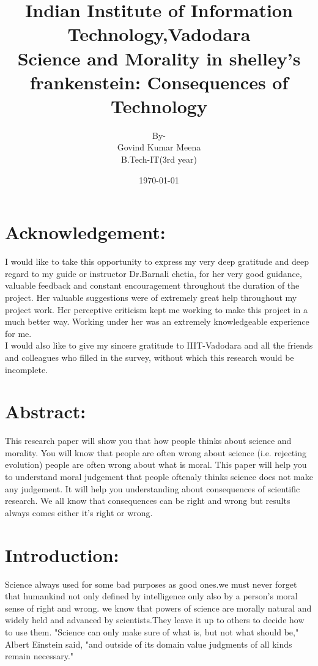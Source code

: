 \documentclass[12pt]{report}
\title{\textbf{Indian Institute of Information Technology,Vadodara\\} \color{blue}Science and Morality in shelley's frankenstein: Consequences of Technology}
\date{\today}
\author{By-\\ Govind Kumar Meena\\B.Tech-IT(3rd year)}
\begin{document}
\maketitle

\tableofcontents
\newpage
\section{Acknowledgement:}
\LARGE
I would like to take this opportunity to express my very deep gratitude and deep regard to my guide or instructor Dr.Barnali chetia, for her very good guidance, valuable feedback and constant encouragement throughout the duration of the project. Her valuable suggestions were of extremely great help throughout my project work. Her perceptive criticism kept me working to make this project in a much better way. Working under her was an extremely knowledgeable experience for me.\\
I would also like to give my sincere gratitude to IIIT-Vadodara and all the friends and colleagues who filled in the survey, without which this research would be incomplete.

\newpage
\section{Abstract:}
\LARGE
This research paper will show you that how people thinks about science and morality. You will know that  people are often wrong about science (i.e. rejecting evolution) people are often wrong about what is moral.
This paper will help you to understand moral judgement that people oftenaly thinks science does not make any judgement.
It will help you understanding about consequences of scientific research.
We all know that consequences can be right and wrong but results always comes either it's right or wrong.  

\newpage
\section{Introduction:}
\LARGE
                    Science always used for some bad purposes as good ones.we must never forget that humankind not only defined by intelligence only also by a person's moral sense of right and wrong. we know that powers of science are morally natural and widely held and advanced by scientists.They leave it up to others to decide how to use them. "Science can only make sure of what is, but not what should be," Albert Einstein said, "and outside of its domain value judgments of all kinds remain necessary."
\\
\end{document}
